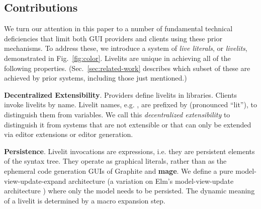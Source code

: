 \subsection{Contributions}
\label{sec:contributions}
We turn our attention in this paper to a number of fundamental technical
deficiencies that limit both GUI providers and clients using these prior mechanisms.
To address these,
we introduce a system of \emph{live literals}, or \emph{livelits},
demonstrated in Fig.~\ref{fig:color}.
Livelits are unique in achieving all of the following properties.
(Sec.~\ref{sec:related-work} describes which subset of these
are achieved by prior systems,
including those just mentioned.)

\newcommand{\llproperty}[1]{\vspace{5px}\noindent\textbf{#1}.}

\llproperty{Decentralized Extensibility}
    Providers define livelits in libraries.
    Clients invoke livelits by name. Livelit names, e.g. ,
    are prefixed by \li{\$} (pronounced ``lit''),
    to distinguish them from variables.
    We call this \emph{decentralized extensibility}
    to distinguish it from systems that are not extensible or
    that can only be extended via editor extensions or editor generation.

\llproperty{Persistence}
  Livelit invocations are expressions, i.e. they  are persistent elements of the syntax tree. They operate as
  graphical literals, rather than as the ephemeral code generation GUIs of Graphite and \textbf{mage}.
  We define a pure model-view-update-expand architecture
  (a variation on Elm's model-view-update architecture \cite{ElmArchitecture})
  where only the model needs to be persisted.
  The dynamic meaning of a livelit is determined by a macro expansion step.

